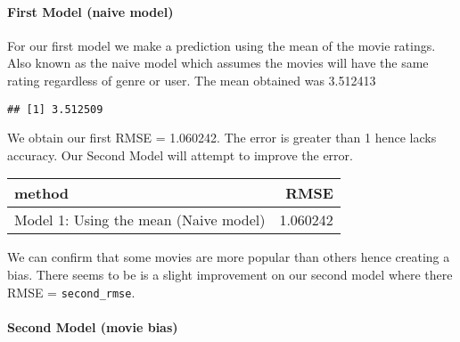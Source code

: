 \documentclass[
]{article}
\newenvironment{Shaded}{\begin{snugshade}}{\end{snugshade}}
\newcommand{\AttributeTok}[1]{\textcolor[rgb]{0.77,0.63,0.00}{#1}}
\newcommand{\CommentTok}[1]{\textcolor[rgb]{0.56,0.35,0.01}{\textit{#1}}}
\newcommand{\FunctionTok}[1]{\textcolor[rgb]{0.00,0.00,0.00}{#1}}
\newcommand{\NormalTok}[1]{#1}
\newcommand{\OtherTok}[1]{\textcolor[rgb]{0.56,0.35,0.01}{#1}}
\newcommand{\SpecialCharTok}[1]{\textcolor[rgb]{0.00,0.00,0.00}{#1}}
\newcommand{\StringTok}[1]{\textcolor[rgb]{0.31,0.60,0.02}{#1}}
\begin{document}
\hypertarget{first-model-naive-model}{%
\paragraph{First Model (naive model)}\label{first-model-naive-model}}

For our first model we make a prediction using the mean of the movie
ratings. Also known as the naive model which assumes the movies will
have the same rating regardless of genre or user. The mean obtained was
3.512413

\begin{verbatim}
## [1] 3.512509
\end{verbatim}

We obtain our first RMSE = 1.060242. The error is greater than 1 hence
lacks accuracy. Our Second Model will attempt to improve the error.

\begin{Shaded}
\end{Shaded}

\begin{longtable}[]{@{}lr@{}}
\toprule
method & RMSE \\
\midrule
\endhead
Model 1: Using the mean (Naive model) & 1.060242 \\
\bottomrule
\end{longtable}

We can confirm that some movies are more popular than others hence
creating a bias. There seems to be is a slight improvement on our second
model where there RMSE = \texttt{second\_rmse}.

\hypertarget{second-model-movie-bias}{%
\paragraph{Second Model (movie bias)}\label{second-model-movie-bias}}
\end{document}
